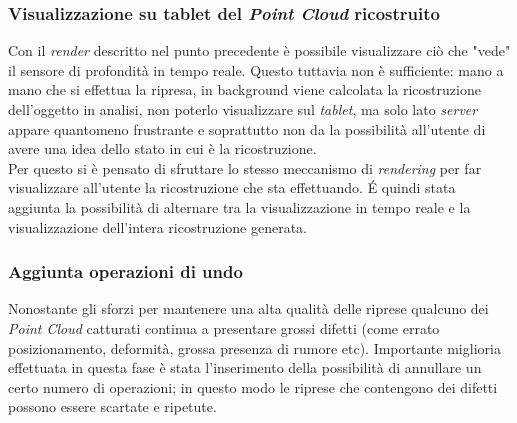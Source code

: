\subsubsection{Visualizzazione su tablet del \emph{Point Cloud} ricostruito}
Con il \emph{render} descritto nel punto precedente è possibile visualizzare ciò che "vede" il sensore di profondità in tempo reale. Questo tuttavia non è sufficiente: mano a mano che si effettua la ripresa, in background viene calcolata la ricostruzione dell'oggetto in analisi, non poterlo visualizzare sul \emph{tablet}, ma solo lato \emph{server} appare quantomeno frustrante e soprattutto non da la possibilità all'utente di avere una idea dello stato in cui è la ricostruzione. \\
Per questo si è pensato di sfruttare lo stesso meccanismo di \emph{rendering} per far visualizzare all'utente la ricostruzione che sta effettuando. É quindi stata aggiunta la possibilità di alternare tra la visualizzazione in tempo reale e la visualizzazione dell'intera ricostruzione generata.

\subsubsection{Aggiunta operazioni di undo}
Nonostante gli sforzi per mantenere una alta qualità delle riprese qualcuno dei \emph{Point Cloud} catturati continua a presentare grossi difetti (come errato posizionamento, deformità, grossa presenza di rumore etc).
Importante miglioria effettuata in questa fase è stata l'inserimento della possibilità di annullare un certo numero di operazioni; in questo modo le riprese che contengono dei difetti possono essere scartate e ripetute.

